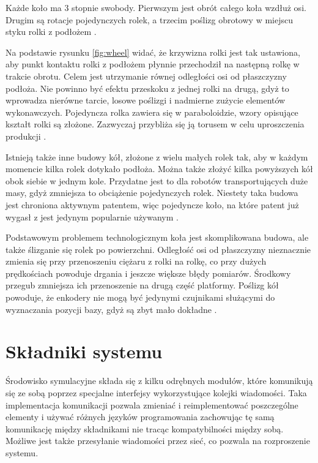 Każde koło ma 3 stopnie swobody. Pierwszym jest obrót całego koła wzdłuż osi.
Drugim są rotacje pojedynczych rolek, a trzecim poślizg obrotowy w miejscu styku rolki z podłożem \cite{kinematic_modeling}.

Na podstawie rysunku \ref{fig:wheel} widać, że krzywizna rolki jest tak ustawiona, aby punkt kontaktu rolki z podłożem płynnie przechodził na następną rolkę w trakcie obrotu.
Celem jest utrzymanie równej odległości osi od płaszczyzny podłoża.
Nie powinno być efektu przeskoku z jednej rolki na drugą, gdyż to wprowadza nierówne tarcie, losowe poślizgi i nadmierne zużycie elementów wykonawczych.
Pojedyncza rolka zawiera się w paraboloidzie, wzory opisujące kształt rolki są złożone.
Zazwyczaj przybliża się ją torusem w celu uproszczenia produkcji \cite{rollers}.

Istnieją także inne budowy kół, złożone z wielu małych rolek tak, aby w każdym momencie kilka rolek dotykało podłoża.
Można także złożyć kilka powyższych kół obok siebie w jednym kole.
Przydatne jest to dla robotów transportujących duże masy, gdyż zmniejsza to obciążenie pojedynczych rolek.
Niestety taka budowa jest chroniona aktywnym patentem, więc pojedyncze koło, na które patent już wygasł z jest jedynym popularnie używanym \cite{paletobot}.

Podstawowym problemem technologicznym koła jest skomplikowana budowa, ale także ślizganie się rolek po powierzchni.
Odległość osi od płaszczyzny nieznacznie zmienia się przy przenoszeniu ciężaru z rolki na rolkę, co przy dużych prędkościach powoduje drgania i jeszcze większe błędy pomiarów.
Środkowy przegub zmniejsza ich przenoszenie na drugą część platformy.
Poślizg kół powoduje, że enkodery nie mogą być jedynymi czujnikami służącymi do wyznaczania pozycji bazy, gdyż są zbyt mało dokładne \cite{heavy}.

\section{Składniki systemu}
Środowisko symulacyjne składa się z kilku odrębnych modułów, które komunikują się ze sobą poprzez specjalne interfejsy wykorzystujące kolejki wiadomości.
Taka implementacja komunikacji pozwala zmieniać i reimplementować poszczególne elementy i używać różnych języków programowania zachowując tę samą komunikację między składnikami nie tracąc kompatybilności między sobą.
Możliwe jest także przesyłanie wiadomości przez sieć, co pozwala na rozproszenie systemu.

